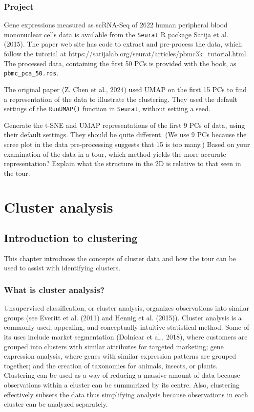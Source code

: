 \documentclass[
  letterpaper,
]{krantz}
\begin{document}
\section*{Project}\label{project-2}


Gene expressions measured as scRNA-Seq of 2622 human peripheral blood
mononuclear cells data is available from the \texttt{Seurat} R package
Satija et al. (2015). The paper web site has code to extract and
pre-process the data, which follow the tutorial at
https://satijalab.org/seurat/articles/pbmc3k\_tutorial.html. The
processed data, containing the first 50 PCs is provided with the book,
as \texttt{pbmc\_pca\_50.rds}.

The original paper (Z. Chen et al., 2024) used UMAP on the first 15 PCs
to find a representation of the data to illustrate the clustering. They
used the default settings of the \texttt{RunUMAP()} function in
\texttt{Seurat}, without setting a seed.

Generate the t-SNE and UMAP representations of the first 9 PCs of data,
using their default settings. They should be quite different. (We use 9
PCs because the scree plot in the data pre-processing suggests that 15
is too many.) Based on your examination of the data in a tour, which
method yields the more accurate representation? Explain what the
structure in the 2D is relative to that seen in the tour.

\part{Cluster analysis}

\chapter{Introduction to clustering}\label{sec-intro-clust}

This chapter introduces the concepts of cluster data and how the tour
can be used to assist with identifying clusters.

\section{What is cluster analysis?}\label{what-is-cluster-analysis}

Unsupervised classification, or cluster analysis, organizes observations
into similar groups (see Everitt et al. (2011) and Hennig et al.
(2015)). Cluster analysis is a commonly used, appealing, and
conceptually intuitive statistical method. Some of its uses include
market segmentation (Dolnicar et al., 2018), where customers are grouped
into clusters with similar attributes for targeted marketing; gene
expression analysis, where genes with similar expression patterns are
grouped together; and the creation of taxonomies for animals, insects,
or plants. Clustering can be used as a way of reducing a massive amount
of data because observations within a cluster can be summarized by its
centre. Also, clustering effectively subsets the data thus simplifying
analysis because observations in each cluster can be analyzed
separately.
\end{document}

